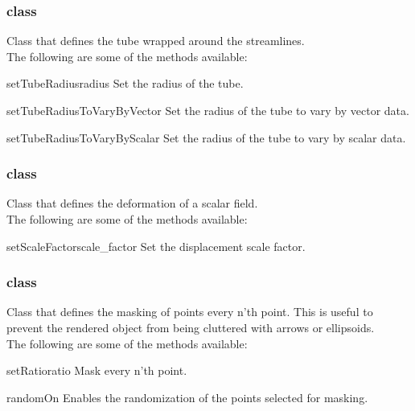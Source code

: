 \subsubsection{\Tube class}
Class that defines the tube wrapped around the streamlines. \\

The following are some of the methods available:

\begin{methoddesc}[Tube]{setTubeRadius}{radius}
Set the radius of the tube.
\end{methoddesc}

\begin{methoddesc}[Tube]{setTubeRadiusToVaryByVector}{}
Set the radius of the tube to vary by vector data.
\end{methoddesc}

\begin{methoddesc}[Tube]{setTubeRadiusToVaryByScalar}{}
Set the radius of the tube to vary by scalar data.
\end{methoddesc}

\subsubsection{\Warp class}
Class that defines the deformation of a scalar field. \\

The following are some of the methods available:

\begin{methoddesc}[Warp]{setScaleFactor}{scale_factor}
Set the displacement scale factor.
\end{methoddesc}

\subsubsection{\MaskPoints class}
Class that defines the masking of points 
every n'th point.  This is useful to prevent the rendered object
from being cluttered with arrows or ellipsoids. \\

The following are some of the methods available:

\begin{methoddesc}[MaskPoints]{setRatio}{ratio}
Mask every n'th point.
\end{methoddesc}

\begin{methoddesc}[MaskPoints]{randomOn}{}
Enables the randomization of the points selected for masking.
\end{methoddesc}

